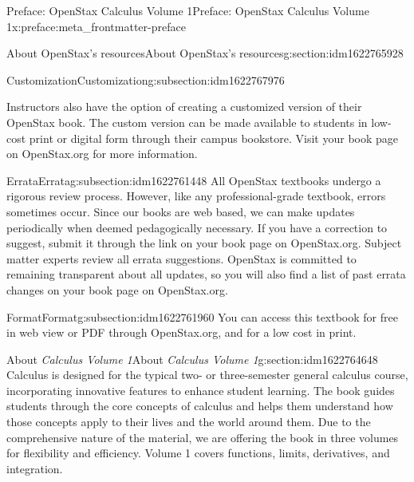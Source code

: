 \documentclass[oneside,10pt,]{book}
\numberwithin{equation}{section}
\begin{document}
\begin{preface}{Preface: OpenStax Calculus Volume 1}{}{Preface: OpenStax Calculus Volume 1}{}{}{x:preface:meta_frontmatter-preface}
\begin{sectionptx}{About OpenStax's resources}{}{About OpenStax's resources}{}{}{g:section:idm1622765928}
\begin{subsectionptx}{Customization}{}{Customization}{}{}{g:subsection:idm1622767976}
\par
Instructors also have the option of creating a customized version of their OpenStax book. The custom version can be made available to students in low-cost print or digital form through their campus bookstore. Visit your book page on OpenStax.org for more information.%
\end{subsectionptx}
%
%
\typeout{************************************************}
\typeout{************************************************}
%
\begin{subsectionptx}{Errata}{}{Errata}{}{}{g:subsection:idm1622761448}
All OpenStax textbooks undergo a rigorous review process. However, like any professional-grade textbook, errors sometimes occur. Since our books are web based, we can make updates periodically when deemed pedagogically necessary. If you have a correction to suggest, submit it through the link on your book page on OpenStax.org. Subject matter experts review all errata suggestions. OpenStax is committed to remaining transparent about all updates, so you will also find a list of past errata changes on your book page on OpenStax.org.%
\end{subsectionptx}
%
%
\typeout{************************************************}
\typeout{************************************************}
%
\begin{subsectionptx}{Format}{}{Format}{}{}{g:subsection:idm1622761960}
You can access this textbook for free in web view or PDF through OpenStax.org, and for a low cost in print.%
\end{subsectionptx}
\end{sectionptx}
%
%
\typeout{************************************************}
\typeout{************************************************}
%
\begin{sectionptx}{About \emph{Calculus Volume 1}}{}{About \emph{Calculus Volume 1}}{}{}{g:section:idm1622764648}
Calculus is designed for the typical two- or three-semester general calculus course, incorporating innovative features to enhance student learning. The book guides students through the core concepts of calculus and helps them understand how those concepts apply to their lives and the world around them. Due to the comprehensive nature of the material, we are offering the book in three volumes for flexibility and efficiency. Volume 1 covers functions, limits, derivatives, and integration.%
%
%
\typeout{************************************************}

\end{sectionptx}
\end{preface}
\end{document}

